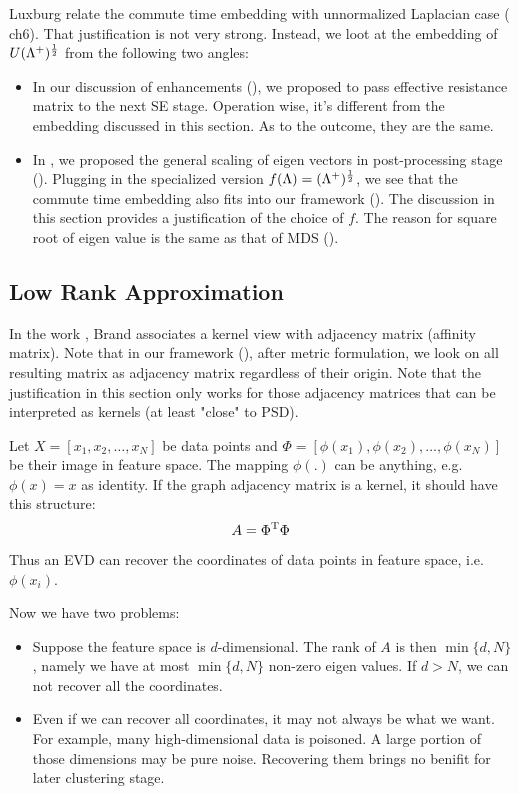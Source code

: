 Luxburg relate the commute time embedding with unnormalized Laplacian case
(\cite{von2007tutorial} ch6). That justification is not very strong. Instead, 
we loot at the embedding of $  U (\Lambda^{+})^{\frac{1}{2}} $
from the following two angles:
\begin{itemize}
	\item In our discussion of enhancements
	(\rsec{\ref{sec:enhance}}), we proposed to pass 
	effective resistance matrix to the next SE stage. 
	Operation wise, it's different from the embedding discussed
	in this section. As to the outcome, they are the same. 
	\item In \rsec{\ref{sec:postproc}}, we proposed the general scaling 
	of eigen vectors in post-processing stage (\req{\ref{eq:post_scale_f}}). 
	Plugging in the 
	specialized version $ f(\Lambda) = (\Lambda^{+})^{\frac{1}{2}} $, 
	we see that the commute time embedding also fits into our 
	framework (\rsec{\ref{sec:framework}}). The discussion in this section 
	provides a justification of the choice of $ f $. 
	The reason for square root of eigen value is the same as that of 
	MDS (\rsec{\ref{sec:mds}}). 
\end{itemize}


\subsection{Low Rank Approximation}
\label{sec:lrapprox}

In the work \cite{brand2003unifying}, Brand associates 
a kernel view with adjacency matrix (affinity matrix). 
Note that in our framework (\rsec{\ref{sec:framework}}), 
after metric formulation, we look on all resulting matrix 
as adjacency matrix regardless of their origin. Note that 
the justification in this section only works for those adjacency matrices 
that can be interpreted as kernels (at least "close" to PSD).  

Let $X = [x_1, x_2, \ldots, x_N]$ be data points and 
$\Phi = [\phi(x_1), \phi(x_2), \ldots, \phi(x_N)]$ be 
their image in feature space. The mapping $ \phi(.) $ 
can be anything, e.g. $ \phi(x) = x $ as identity. If the graph 
adjacency matrix is a kernel, it should have this structure:
\begin{equation}
	A = \Phi^\mathrm{T} \Phi
\end{equation}
Thus an EVD can recover the coordinates of data points in feature 
space, i.e. $ \phi(x_i) $. 

Now we have two problems:
\begin{itemize}
	\item Suppose the feature space is $ d $-dimensional. The rank of 
	$ A $ is then $ \min\{d,N\} $, namely we have at most $ \min\{d,N\} $
	non-zero eigen values. If $ d > N $, we can not recover all the coordinates. 
	\item Even if we can recover all coordinates, it may not always be 
	what we want. For example, many high-dimensional data is poisoned. 
	A large portion of those dimensions may be pure noise. Recovering them 
	brings no benifit for later clustering stage. 
\end{itemize}

